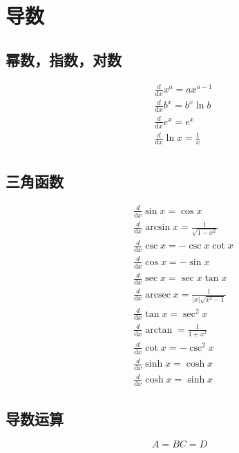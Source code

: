 \section{导数}

\subsection{幂数，指数，对数}
\begin{align}
&\frac{d}{\mathrm{d}{x}}x^a = ax^{a-1} \\
&\frac{d}{\mathrm{d}{x}}b^x = b^x\ln b \\
&\frac{d}{\mathrm{d}{x}}e^x = e^x \\
&\frac{d}{\mathrm{d}{x}} \ln{x} = \frac{1}{x} \\
\end{align}

\subsection{三角函数}
\begin{align}
&\frac{d}{\mathrm{d}{x}}\sin x = \cos x \\
&\frac{d}{\mathrm{d}{x}}\arcsin x = \frac{1}{\sqrt{1-x^2}} \\
&\frac{d}{\mathrm{d}{x}}\csc x = -\csc x\cot x \\
&\frac{d}{\mathrm{d}{x}}\cos x = -\sin x \\
&\frac{d}{\mathrm{d}{x}}\sec x = \sec x\tan x \\
&\frac{d}{\mathrm{d}{x}}\operatorname{arcsec}{x}=\frac{1}{\left|x\right|\sqrt{x^2-1}}\\
&\frac{d}{\mathrm{d}{x}}\tan x = \sec^2x \\
&\frac{d}{\mathrm{d}{x}}\arctan = \frac{1}{1+x^2} \\
&\frac{d}{\mathrm{d}{x}}\cot x = -\csc^2x \\
&\frac{d}{\mathrm{d}{x}}\sinh x = \cosh x \\
&\frac{d}{\mathrm{d}{x}}\cosh x = \sinh x
\end{align}


\subsection{导数运算}

\newenvironment{mysubequations}
{ \begin{subequations}
  \renewcommand {\theequation}{\theparentequation-\arabic{equation}}}
{\end{subequations}}

\begin{mysubequations}
\begin{equation}
A = B
\end{equation}
\begin{equation}
C = D
\end{equation}
\end{mysubequations}
